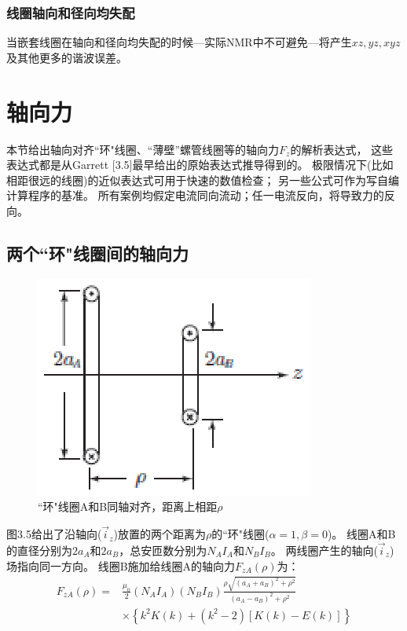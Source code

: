 \subsubsection{线圈轴向和径向均失配}
当嵌套线圈在轴向和径向均失配的时候---实际NMR中不可避免---将产生$xz,yz,xyz$及其他更多的谐波误差。

\section{轴向力}
本节给出轴向对齐``环"线圈、``薄壁''螺管线圈等的轴向力$F_z$的解析表达式，
这些表达式都是从Garrett [3.5]最早给出的原始表达式推导得到的。
极限情况下(比如相距很远的线圈)的近似表达式可用于快速的数值检查；
另一些公式可作为写自编计算程序的基准。
所有案例均假定电流同向流动；任一电流反向，将导致力的反向。

\subsection{两个``环"线圈间的轴向力}
\begin{figure}[htbp]
	\centering
	\includegraphics[scale=1]{chpt3/figs/fig3.5.eps}
	\caption{``环"线圈A和B同轴对齐，距离上相距$\rho$}
\end{figure}
图3.5给出了沿轴向($\vec{i}_z$)放置的两个距离为$\rho$的``环"线圈($\alpha=1,\beta=0$)。
线圈A和B的直径分别为$2a_A$和$2a_B$，总安匝数分别为$N_A I_A$和$N_B I_B$。
两线圈产生的轴向($\vec{i}_z$)场指向同一方向。
线圈B施加给线圈A的轴向力$F_{zA}(\rho)$为：
\begin{equation}
\begin{split}
  F_{zA}(\rho)=&\frac{\mu_0}{2}(N_A I_A)(N_B I_B)\frac{\rho\sqrt{(a_A+a_B)^2+\rho^2}}{(a_A-a_B)^2+\rho^2}\\
  &\times\left\{k^2 K(k)+(k^2-2)[K(k)-E(k)]\right\}
\end{split}
\end{equation}

